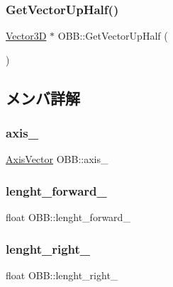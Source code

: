 \subsubsection{\texorpdfstring{Get\+Vector\+Up\+Half()}{GetVectorUpHalf()}}
{\footnotesize\ttfamily \mbox{\hyperlink{class_vector3_d}{Vector3D}} $\ast$ O\+B\+B\+::\+Get\+Vector\+Up\+Half (\begin{DoxyParamCaption}{ }\end{DoxyParamCaption})\hspace{0.3cm}{\ttfamily [inline]}}



\subsection{メンバ詳解}
\mbox{\label{class_o_b_b_ab002fad8cf0a9a08fc50407dc849aab1}} 
\subsubsection{\texorpdfstring{axis\+\_\+}{axis\_}}
{\footnotesize\ttfamily \mbox{\hyperlink{class_axis_vector}{Axis\+Vector}} O\+B\+B\+::axis\+\_\+}

\mbox{\label{class_o_b_b_a999f5165cf4cb28b7b59a75e81613bab}} 
\subsubsection{\texorpdfstring{lenght\+\_\+forward\+\_\+}{lenght\_forward\_}}
{\footnotesize\ttfamily float O\+B\+B\+::lenght\+\_\+forward\+\_\+}

\mbox{\label{class_o_b_b_a33c3db74caad2f0827d71ab16e9c5f1d}} 
\subsubsection{\texorpdfstring{lenght\+\_\+right\+\_\+}{lenght\_right\_}}
{\footnotesize\ttfamily float O\+B\+B\+::lenght\+\_\+right\+\_\+}

